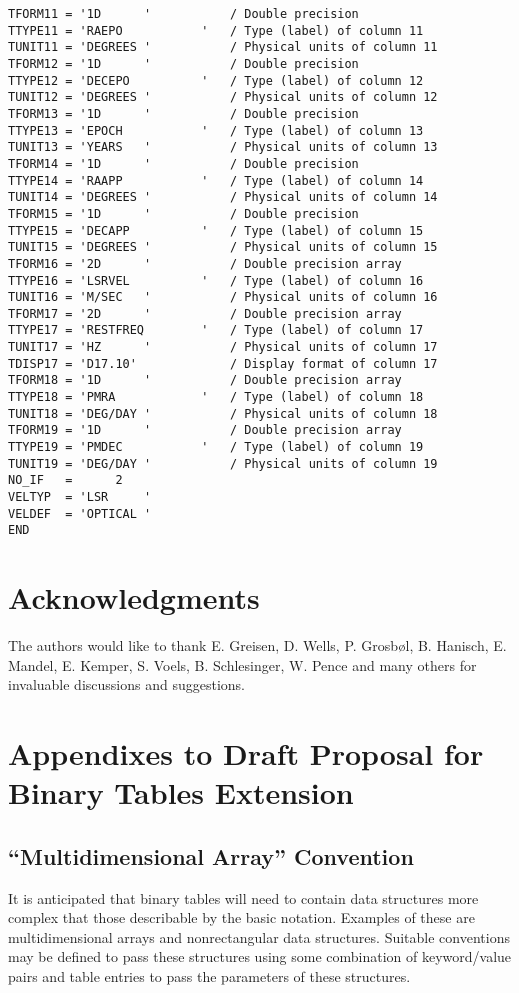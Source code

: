 {\begin{verbatim}
TFORM11 = '1D      '           / Double precision
TTYPE11 = 'RAEPO           '   / Type (label) of column 11
TUNIT11 = 'DEGREES '           / Physical units of column 11
TFORM12 = '1D      '           / Double precision
TTYPE12 = 'DECEPO          '   / Type (label) of column 12
TUNIT12 = 'DEGREES '           / Physical units of column 12
TFORM13 = '1D      '           / Double precision
TTYPE13 = 'EPOCH           '   / Type (label) of column 13
TUNIT13 = 'YEARS   '           / Physical units of column 13
TFORM14 = '1D      '           / Double precision
TTYPE14 = 'RAAPP           '   / Type (label) of column 14
TUNIT14 = 'DEGREES '           / Physical units of column 14
TFORM15 = '1D      '           / Double precision
TTYPE15 = 'DECAPP          '   / Type (label) of column 15
TUNIT15 = 'DEGREES '           / Physical units of column 15
TFORM16 = '2D      '           / Double precision array
TTYPE16 = 'LSRVEL          '   / Type (label) of column 16
TUNIT16 = 'M/SEC   '           / Physical units of column 16
TFORM17 = '2D      '           / Double precision array
TTYPE17 = 'RESTFREQ        '   / Type (label) of column 17
TUNIT17 = 'HZ      '           / Physical units of column 17
TDISP17 = 'D17.10'             / Display format of column 17
TFORM18 = '1D      '           / Double precision array
TTYPE18 = 'PMRA            '   / Type (label) of column 18
TUNIT18 = 'DEG/DAY '           / Physical units of column 18
TFORM19 = '1D      '           / Double precision array
TTYPE19 = 'PMDEC           '   / Type (label) of column 19
TUNIT19 = 'DEG/DAY '           / Physical units of column 19
NO_IF   =      2
VELTYP  = 'LSR     '
VELDEF  = 'OPTICAL '
END

\end{verbatim}}


\section{Acknowledgments}

   The authors would like to thank E. Greisen, D. Wells, P. Grosb\o l, 
B. Hanisch, E. Mandel, E. Kemper, S. Voels, B. Schlesinger, W. Pence
and many others for invaluable discussions and suggestions.

\section{Appendixes to Draft Proposal for Binary Tables Extension}
\label{s:binapp}
\subsection{``Multidimensional Array'' Convention}
\label{s:mdim}
It is anticipated that binary tables will need to contain data
structures more complex that those describable by the basic notation.
Examples of these are multidimensional arrays
and nonrectangular data
structures.  Suitable
 conventions may be defined to pass these
structures using some combination of keyword/value pairs and table
entries to pass the parameters of these structures.

